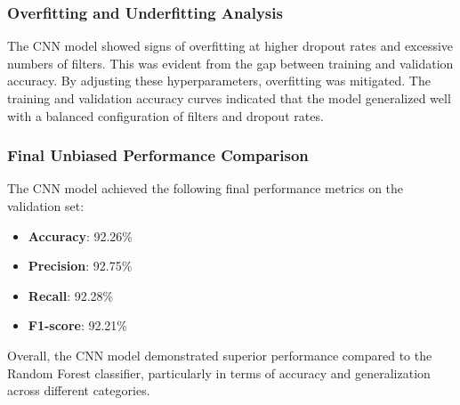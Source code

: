 \subsubsection{Overfitting and Underfitting Analysis}
The CNN model showed signs of overfitting at higher dropout rates and excessive numbers of filters. This was evident from the gap between training and validation accuracy. By adjusting these hyperparameters, overfitting was mitigated. The training and validation accuracy curves indicated that the model generalized well with a balanced configuration of filters and dropout rates.

\subsubsection{Final Unbiased Performance Comparison}
The CNN model achieved the following final performance metrics on the validation set:
\begin{itemize}
    \item \textbf{Accuracy}: 92.26\%
    \item \textbf{Precision}: 92.75\%
    \item \textbf{Recall}: 92.28\%
    \item \textbf{F1-score}: 92.21\%
\end{itemize}

Overall, the CNN model demonstrated superior performance compared to the Random Forest classifier, particularly in terms of accuracy and generalization across different categories.

